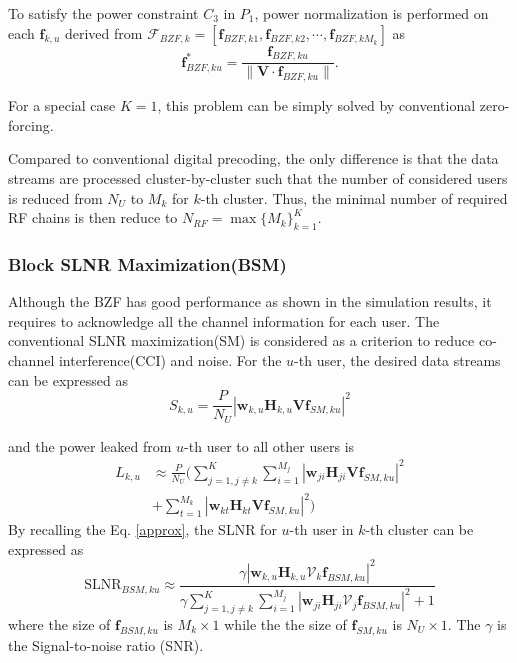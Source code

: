 \documentclass[conference]{IEEEtran}
\begin{document}
{To satisfy the power constraint $C_3$ in $P_1$, power normalization is performed on each ${\bm f}_{k,u}$ derived from $\bm{\mathcal{F}}_{BZF,k}=\left[\bm{f}_{BZF,k1},\bm{f}_{BZF,k2},\cdots,\bm{f}_{BZF,kM_k}\right]$ as
\begin{equation}\label{eq:ZFU-HBF2}
\bm{f}^*_{BZF,ku} = {\frac{\bm{f}_{BZF,ku}}{\|\bm{V}\cdot\bm{f}_{BZF,ku}\|}}.
\end{equation}

For a special case $K=1$, this problem can be simply solved by conventional zero-forcing.

Compared to conventional digital precoding, the only difference is that the data streams are processed cluster-by-cluster such that the number of considered users is reduced from $N_U$ to $M_k$ for $k$-th cluster. Thus, the minimal number of required RF chains is then reduce to $N_{RF} = \max \{M_k\}_{k=1}^K$.


\subsubsection{Block SLNR Maximization(BSM)}
Although the BZF has good performance as shown in the simulation results, it requires to acknowledge all the channel information for each user.
The conventional SLNR maximization(SM) is considered as a criterion to reduce co-channel interference(CCI) and noise.  For the $u$-th user, the desired data streams can be expressed as
\begin{equation}
	S_{k,u} = \frac{P}{N_U}|\bm{w}_{k,u} \bm{H}_{k,u} \bm{V} \bm{f}_{SM,ku}|^2
\end{equation}

and the power leaked from $u$-th user to all other users is
\begin{align}
L_{k,u} &\approx \frac{P}{N_U}(\sum_{j=1,j\neq k}^{K}\sum_{i=1}^{M_j}|\bm{w}_{ji} \bm{H}_{ji} \bm{V} \bm{f}_{SM,ku}|^2\nonumber\\
&+ \sum_{t=1}^{M_k}|\bm{w}_{kt} \bm{H}_{kt} \bm{V}\bm{f}_{SM,ku}|^2)
\end{align}
By recalling the Eq. \eqref{approx}, the SLNR for $u$-th user in $k$-th cluster can be expressed as
\begin{equation}
	\text{SLNR}_{BSM, ku} \approx \frac{\gamma|\bm{w}_{k,u} \bm{H}_{k,u} \bm{\mathcal{V}}_k \bm{f}_{BSM,ku}|^2}{\gamma \sum_{j=1,j\neq k}^{K}\sum_{i=1}^{M_j}|\bm{w}_{ji} \bm{H}_{ji} \bm{\mathcal{V}}_j \bm{f}_{BSM,ku}|^2+1}
\end{equation}
where the size of $\bm{f}_{BSM,ku} $ is $M_k\times 1$ while the the size of $\bm{f}_{SM,ku}$ is $N_U \times 1$. The $\gamma$ is the Signal-to-noise ratio (SNR).

}
\end{document}
